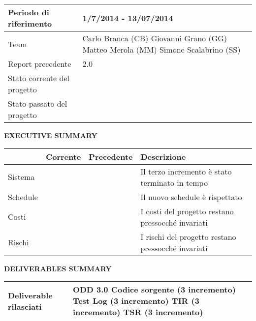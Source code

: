 
\begin{table}[ht]
\centering
\begin{tabular}{|g|p{8cm}|}
 \hline
  Periodo di riferimento		& 1/7/2014 - 13/07/2014\\
  \hline
  Team 					& Carlo Branca (CB)\newline
  					Giovanni Grano (GG)\newline
  					Matteo Merola (MM)\newline
  					Simone Scalabrino (SS)\\
  \hline
  Report precedente			& 2.0\\
  \hline
  Stato corrente del progetto		& \\
  \hline
  Stato passato del progetto		& \\
  \hline
\end{tabular}
\end{table}

\begin{center} \textbf{EXECUTIVE SUMMARY} \end{center}
\begin{table}[ht]
\centering
\begin{tabular}{|h|p{2cm}|p{2cm}|p{5.5cm}|}
  \hline
  	& Corrente		& Precedente		& Descrizione\\
  \hline
  Sistema		& 	& 	& \footnotesize Il terzo incremento è stato terminato in tempo\\
  \hline
  Schedule		& 	& 	& \footnotesize Il nuovo schedule è rispettato\\
  \hline
  Costi			& 	& 	& \footnotesize I costi del progetto restano pressocché invariati\\
  \hline
  Rischi		& 	& 	& \footnotesize I rischi del progetto restano pressocché invariati\\
  \hline
\end{tabular}
\end{table}

\begin{center} \textbf{DELIVERABLES SUMMARY} \end{center}
\begin{table}[ht]
\centering
\begin{tabular}{|g|p{8cm}|}
  \hline
  Deliverable rilasciati				& \footnotesize ODD 3.0\newline
							Codice sorgente (3 incremento)\newline
							Test Log (3 incremento)\newline
							TIR (3 incremento)\newline
							TSR (3 incremento)\\
  \hline
\end{tabular}
\end{table}
\newpage


